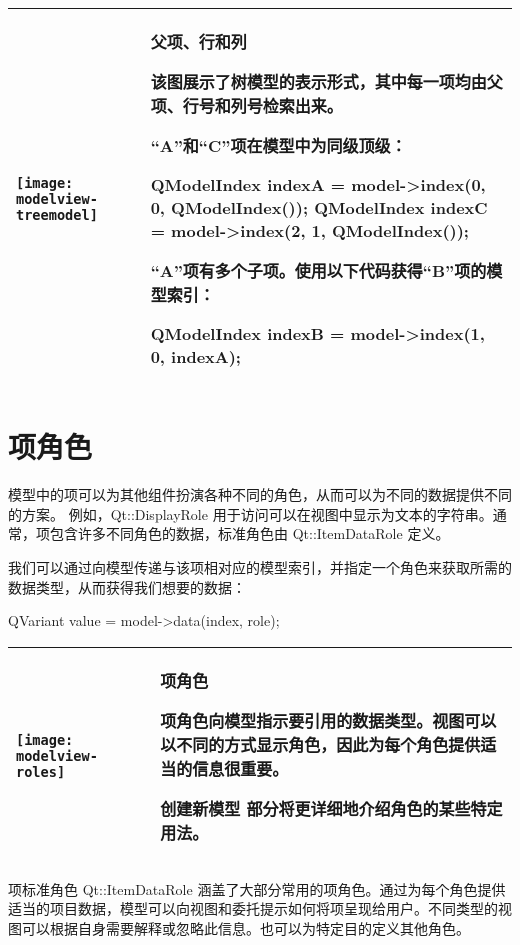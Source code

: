 \begin{tabular}{|l|m{25em}|}
\hline
    \texttt{[image: modelview-treemodel]}
  & 
父项、行和列

该图展示了树模型的表示形式，其中每一项均由父项、行号和列号检索出来。

“A”和“C”项在模型中为同级顶级：

\begin{cppcode}
QModelIndex indexA = model->index(0, 0, QModelIndex());
QModelIndex indexC = model->index(2, 1, QModelIndex());
\end{cppcode}

“A”项有多个子项。使用以下代码获得“B”项的模型索引：

\begin{cppcode}
QModelIndex indexB = model->index(1, 0, indexA);
\end{cppcode}
\\
\hline	
\end{tabular}

\section{项角色}

模型中的项可以为其他组件扮演各种不同的角色，从而可以为不同的数据提供不同的方案。 例如，Qt::DisplayRole 用于访问可以在视图中显示为文本的字符串。通常，项包含许多不同角色的数据，标准角色由 Qt::ItemDataRole 定义。

我们可以通过向模型传递与该项相对应的模型索引，并指定一个角色来获取所需的数据类型，从而获得我们想要的数据：

\begin{cppcode}
QVariant value = model->data(index, role);
\end{cppcode}


\begin{tabular}{|l|m{25em}|}
\hline
    \texttt{[image: modelview-roles]}
  & 
项角色

项角色向模型指示要引用的数据类型。视图可以以不同的方式显示角色，因此为每个角色提供适当的信息很重要。

创建新模型 部分将更详细地介绍角色的某些特定用法。\\
\hline	
\end{tabular}


项标准角色 Qt::ItemDataRole 涵盖了大部分常用的项角色。通过为每个角色提供适当的项目数据，模型可以向视图和委托提示如何将项呈现给用户。不同类型的视图可以根据自身需要解释或忽略此信息。也可以为特定目的定义其他角色。

